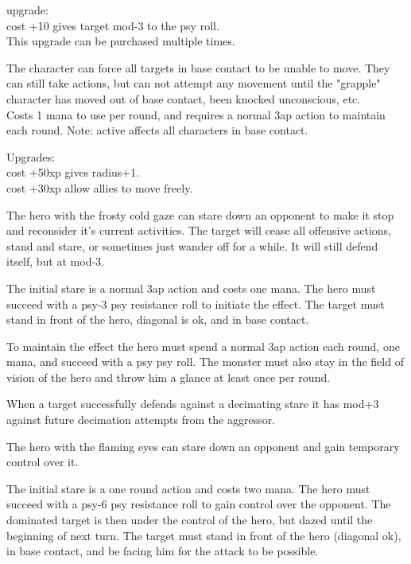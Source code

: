 upgrade: \\
cost +10 gives target mod-3 to the psy roll. \\
This upgrade can be purchased multiple times.


 The character can force all targets in base contact to be unable to move. They can still take actions, but can not attempt any movement until the "grapple" character has moved out of base contact, been knocked unconscious, etc. \\
Costs 1 mana to use per round, and requires a normal 3ap action to maintain each round. Note: active affects all characters in base contact.

Upgrades: \\
cost +50xp gives radius+1.\\
cost +30xp allow allies to move freely.


 The hero with the frosty cold gaze can stare down an opponent to make it stop and reconsider it's current activities. The target will cease all offensive actions, stand and stare, or sometimes just wander off for a while. It will still defend itself, but at mod-3.

The initial stare is a normal 3ap action and costs one mana. The hero must succeed with a psy-3 \vs psy resistance roll to initiate the effect. The target must stand in front of the hero, diagonal is ok, and in base contact.

To maintain the effect the hero must spend a normal 3ap action each round, one mana, and succeed with a psy \vs psy roll. The monster must also stay in the field of vision of the hero and throw him a glance at least once per round.

When a target successfully defends against a decimating stare it has mod+3 against future decimation attempts from the aggressor.


 The hero with the flaming eyes can stare down an opponent and gain temporary control over it.

The initial stare is a one round action and costs two mana. The hero must succeed with a psy-6 \vs psy resistance roll to gain control over the opponent. The dominated target is then under the control of the hero, but dazed until the beginning of next turn. The target must stand in front of the hero (diagonal ok), in base contact, and be facing him for the attack to be possible.


